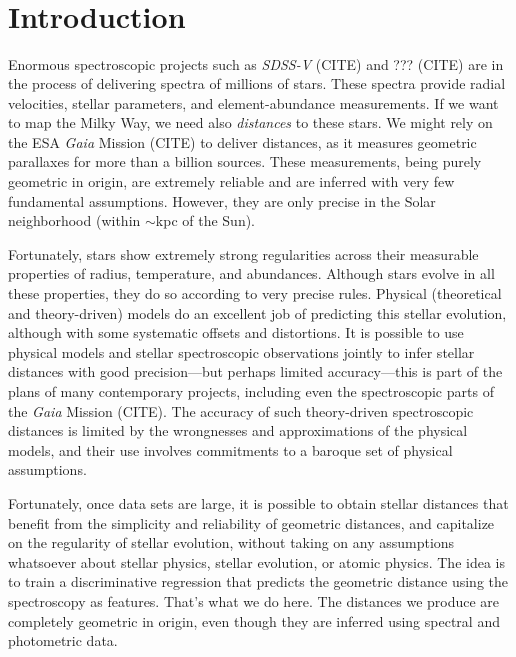 \documentclass[modern]{aastex631}
\newcommand{\acronym}[1]{{\small{#1}}}
\newcommand{\project}[1]{\textsl{#1}}
\newcommand{\Gaia}{\project{Gaia}}
\newcommand{\SDSSV}{\project{\acronym{SDSS-V}}}
\begin{document}

\section*{~}
\clearpage
\section{Introduction}\label{sec:intro}

Enormous spectroscopic projects such as \SDSSV{} (CITE)
and ??? (CITE)
are in the process of delivering spectra of millions of stars.
These spectra provide radial velocities, stellar parameters, and element-abundance
measurements.
If we want to map the Milky Way, we need also \emph{distances} to these stars.
We might rely on the ESA \Gaia{} Mission (CITE) to deliver distances, as it measures
geometric parallaxes for more than a billion sources.
These measurements, being purely geometric in origin, are extremely reliable
and are inferred with very few fundamental assumptions.
However, they are only precise in the Solar neighborhood (within $\sim$kpc of the Sun).

Fortunately, stars show extremely strong regularities across their measurable
properties of radius, temperature, and abundances.
Although stars evolve in all these properties, they do so according to very
precise rules.
Physical (theoretical and theory-driven) models do an excellent job of predicting
this stellar evolution, although with some systematic offsets and distortions.
It is possible to use physical models and stellar spectroscopic observations
jointly to infer stellar distances with good precision---but perhaps limited
accuracy---this is part of the plans of many contemporary projects, including even
the spectroscopic parts of the \Gaia{} Mission (CITE).
The accuracy of such theory-driven spectroscopic distances is limited by the
wrongnesses and approximations of the physical models, and their use involves
commitments to a baroque set of physical assumptions.

Fortunately, once data sets are large, it is possible to obtain stellar distances
that benefit from the simplicity and reliability of geometric distances, and
capitalize on the regularity of stellar evolution, without taking on any assumptions
whatsoever about stellar physics, stellar evolution, or atomic physics.
The idea is to train a discriminative regression that predicts the geometric
distance using the spectroscopy as features.
That's what we do here.
The distances we produce are completely geometric in origin, even though they
are inferred using spectral and photometric data.
\end{document}
